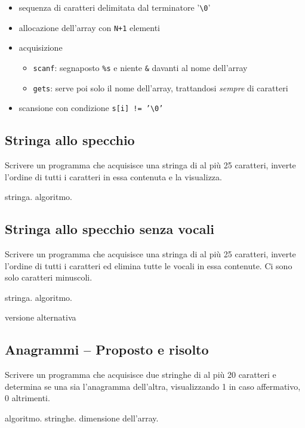 \begin{itemize}
\item sequenza di caratteri delimitata dal terminatore '\texttt{\textbackslash 0}'
\item allocazione dell'array con \texttt{N+1} elementi
\item acquisizione    \begin{itemize}
	\item \texttt{scanf}: segnaposto \texttt{\%s} e niente \texttt{\&} davanti al nome dell'array
	\item \texttt{gets}: serve poi solo il nome dell'array, trattandosi \textit{sempre} di caratteri
    \end{itemize}
\item scansione con condizione \texttt{s[i] != '\textbackslash 0'}
\end{itemize}
\mysep{}

\subsection{Stringa allo specchio}
Scrivere un programma che acquisisce una stringa di al pi\`u 25 caratteri, inverte l'ordine di tutti i caratteri in essa contenuta e la visualizza.

\begin{tags}
stringa. algoritmo.
\end{tags}



\subsection{Stringa allo specchio senza vocali}
Scrivere un programma che acquisisce una stringa di al pi\`u 25 caratteri, inverte l'ordine di tutti i caratteri ed elimina tutte le vocali in essa contenute. Ci sono solo caratteri minuscoli.

\begin{tags}
stringa. algoritmo.
\end{tags}



versione alternativa



\prosep{}

\subsection{Anagrammi -- Proposto e risolto}
Scrivere un programma che acquisisce due stringhe di al pi\`u 20 caratteri e determina se una sia l'anagramma dell'altra, visualizzando 1 in caso affermativo, 0 altrimenti.
\begin{tags}
algoritmo. stringhe. dimensione dell'array.
\end{tags}

